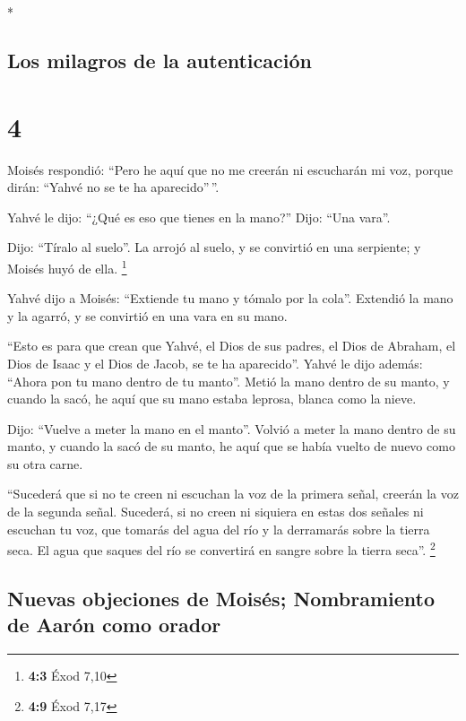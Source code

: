 \begin{paracol}{2}
\begin{otherlanguage}{english}
\end{otherlanguage}

\switchcolumn[0]*

\hypertarget{los-milagros-de-la-autenticaciuxf3n}{%
\subsection{Los milagros de la
autenticación}\label{los-milagros-de-la-autenticaciuxf3n}}

\hypertarget{section-6}{%
\section{4}\label{section-6}}

 Moisés respondió: ``Pero he aquí que no me creerán ni
escucharán mi voz, porque dirán: ``Yahvé no se te ha aparecido''\,''.

 Yahvé le dijo: ``¿Qué es eso que tienes en la mano?''
Dijo: ``Una vara''.

 Dijo: ``Tíralo al suelo''. La arrojó al suelo, y se
convirtió en una serpiente; y Moisés huyó de ella. \footnote{\textbf{4:3}
  Éxod 7,10}

 Yahvé dijo a Moisés: ``Extiende tu mano y tómalo por la
cola''. Extendió la mano y la agarró, y se convirtió en una vara en su
mano.

 ``Esto es para que crean que Yahvé, el Dios de sus
padres, el Dios de Abraham, el Dios de Isaac y el Dios de Jacob, se te
ha aparecido''.  Yahvé le dijo además: ``Ahora pon tu mano
dentro de tu manto''. Metió la mano dentro de su manto, y cuando la
sacó, he aquí que su mano estaba leprosa, blanca como la nieve.

 Dijo: ``Vuelve a meter la mano en el manto''. Volvió a
meter la mano dentro de su manto, y cuando la sacó de su manto, he aquí
que se había vuelto de nuevo como su otra carne.

 ``Sucederá que si no te creen ni escuchan la voz de la
primera señal, creerán la voz de la segunda señal. 
Sucederá, si no creen ni siquiera en estas dos señales ni escuchan tu
voz, que tomarás del agua del río y la derramarás sobre la tierra seca.
El agua que saques del río se convertirá en sangre sobre la tierra
seca''. \footnote{\textbf{4:9} Éxod 7,17}

\hypertarget{nuevas-objeciones-de-moisuxe9s-nombramiento-de-aaruxf3n-como-orador}{%
\subsection{Nuevas objeciones de Moisés; Nombramiento de Aarón como
orador}\label{nuevas-objeciones-de-moisuxe9s-nombramiento-de-aaruxf3n-como-orador}}


\end{paracol}
